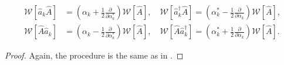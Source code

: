 \begin{theorem}
\label{thm:formalism:mm-wigner:correspondences}
\begin{equation*}
\begin{split}
	\mathcal{W} [ \hat{a}_k \hat{A} ]
		& = \left( \alpha_k + \frac{1}{2} \frac{\partial}{\partial \alpha_k^*} \right)
			\mathcal{W}[\hat{A}],
	\quad
	\mathcal{W} [ \hat{a}_k^\dagger \hat{A} ]
		= \left( \alpha_k^* - \frac{1}{2} \frac{\partial}{\partial \alpha_k} \right)
			\mathcal{W}[\hat{A}], \\
	\mathcal{W} [ \hat{A} \hat{a}_k ]
		& = \left( \alpha_k - \frac{1}{2} \frac{\partial}{\partial \alpha_k^*} \right)
			\mathcal{W}[\hat{A}],
	\quad
	\mathcal{W} [ \hat{A} \hat{a}_k^\dagger ]
		= \left( \alpha_k^* + \frac{1}{2} \frac{\partial}{\partial \alpha_k} \right)
			\mathcal{W}[\hat{A}].
\end{split}
\end{equation*}
\end{theorem}
\begin{proof}
Again, the procedure is the same as in .
\end{proof}
